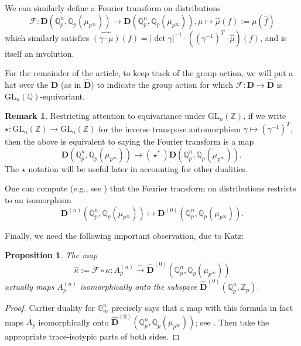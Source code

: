 \documentclass[10pt]{amsart}
\newtheorem{prop}[thm]{Proposition}
\theoremstyle{definition}
\newtheorem{rem}[thm]{Remark}
\newcommand{\Z}{\mathbb{Z}}
\newcommand{\Q}{\mathbb{Q}}
\newcommand{\D}{\mathbf{D}}
\newcommand{\G}{\mathbb{G}}
\newcommand{\GL}{\mathrm{GL}}
\numberwithin{equation}{section}
\begin{document}
    We can similarly define a Fourier transform on distributions 
    \[
    \mathscr{F}:\D(\Q_p^n, \Q_p(\mu_{p^\infty}))\to \D(\Q_p^n, \Q_p(\mu_{p^\infty})), \mu\mapsto \widehat{\mu}(f):= \mu(\widehat{f})
    \]
    which similarly satisfies $\widehat{(\gamma \cdot \mu)}(f) = |\det \gamma|^{-1}\cdot ((\gamma^{-1})^T\cdot \widehat{\mu})(f)$, and is itself an involution. 
    
    For the remainder of the article, to keep track of the group action, we will put a hat over the $\D$ (as in $\hat{\D}$) to indicate the group action for which $\mathscr{F}:\D \to \hat{\D}$ is $\GL_n(\Q)$-equivariant. 

    \begin{rem} \label{rem:stardef}
    Restricting attention to equivariance under $\GL_n(\Z)$, if we write $\star: \GL_n(\Z)\to \GL_n(\Z)$ for the inverse transpose automorphism $\gamma\mapsto (\gamma^{-1})^T$, then the above is equivalent to saying the Fourier transform is a map 
    \[
    \D(\Q_p^n, \Q_p(\mu_{p^\infty}))\to (\star^*)\D(\Q_p^n, \Q_p(\mu_{p^\infty})),
    \]
    The $\star$ notation will be useful later in accounting for other dualities.
    \end{rem}
    
    One can compute (e.g., see \cite{Stevens}) that the Fourier transform on distributions restricts to an isomorphism
    \[
    \D^{(n)}(\Q_p^n, \Q_p(\mu_{p^\infty})) \mapsto \D^{(0)}(\Q_p^n, \Q_p(\mu_{p^\infty})).
    \]
    
    Finally, we need the following important observation, due to Katz:
    \begin{prop}
        The map    
        \[
        \widehat{\kappa}:=\mathscr{F}\circ \kappa: A_p^{(n)} \xrightarrow{\sim} \hat{\D}^{(0)}(\Q_p^n, \Q_p(\mu_{p^\infty}))
        \]
        actually maps $A_p^{(n)}$ isomorphically onto the subspace $\hat{\D}^{(0)}(\Q_p^n, \Z_p)$. 
    \end{prop}
    \begin{proof}
        Cartier duality for $\G_m^n$ precisely says that a map with this formula in fact maps $A_p$ isomorphically onto $\hat{\D}^{(0)}(\Q_p^n, \Q_p(\mu_{p^\infty}))$; see \cite[Theorem 1]{Katz}. Then take the appropriate trace-isotypic parts of both sides.
    \end{proof}
\end{document}
